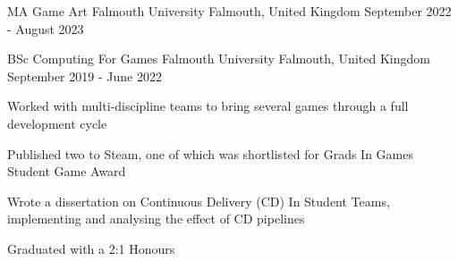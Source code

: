 \begin{cventries}
  \cventry
  {MA Game Art}
  {Falmouth University}
  {Falmouth, United Kingdom}
  {September 2022 - August 2023}
  {
    \begin{cvitems}
      \item
    \end{cvitems}
  }

  \cventry
    {BSc Computing For Games} %
    {Falmouth University} %
    {Falmouth, United Kingdom} %
    {September 2019 - June 2022} %
    {
      \begin{cvitems} %
        \item Worked with multi-discipline teams to bring several games through a full development cycle
        \item Published two to Steam, one of which was shortlisted for Grads In Games Student Game Award
        \item Wrote a dissertation on Continuous Delivery (CD) In Student Teams, implementing and analysing the effect of CD pipelines
        \item Graduated with a 2:1 Honours
      \end{cvitems}
    }
\end{cventries}